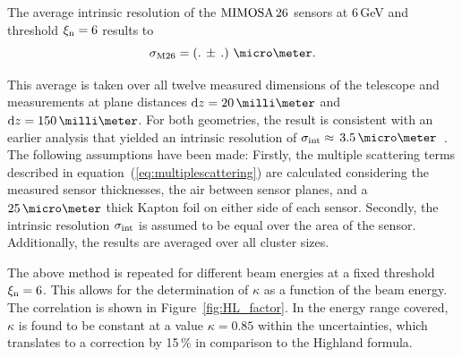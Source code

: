 The average intrinsic resolution of the $\textrm{MIMOSA\,26}$ sensors at 6\,GeV and threshold $\xi_{\textrm{n}} = 6$ results to
\begin{equation}
 \sigma_{\textrm{M26}} = \left( .\,\pm\, \allowbreak . \right)\,\micro\meter.  
\end{equation}

\noindent
This average is taken over all twelve measured dimensions of the telescope and measurements at plane distances $\dz =  20\,\milli\meter$ and $\dz =  150\,\milli\meter$. 
For both geometries, the result is consistent with an earlier analysis that yielded an intrinsic resolution of $\sigmai \approx\,3.5\,\micro\meter$~\cite{ref:mimosa26}.
The following assumptions have been made: 
Firstly, the multiple scattering terms described in equation~(\ref{eq:multiplescattering}) are calculated considering the measured sensor thicknesses, the air between sensor planes, and a $25\,\micro\meter$
thick Kapton foil on either side of each sensor.
Secondly, the intrinsic resolution $\sigma_{\textrm{int}}$ is assumed to be equal over the area of the sensor. 
Additionally, the results are averaged over all cluster sizes. 


The above method is repeated for different beam energies at a fixed threshold $\xi_{\textrm{n}} = 6$. 
This allows for the determination of $\kappa$ as a function of the beam energy. 
The correlation is shown in Figure~\ref{fig:HL_factor}. 
In the energy range covered, $\kappa$ is found to be constant at a value $\kappa = 0.85$ within the uncertainties, which translates to a correction by 15\,\% in comparison to the Highland formula. 

